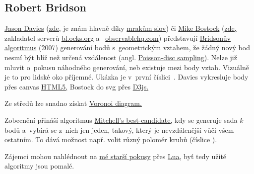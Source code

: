 \subsection{Robert Bridson}
\href{https://www.jasondavies.com/}{Jason Davies} 
(\href{https://www.jasondavies.com/poisson-disc/}{zde,} 
je znám hlavně díky 
\href{https://www.jasondavies.com/wordcloud/}{mrakům slov}) či 
\href{https://bost.ocks.org/mike/}{Mike Bostock} 
(\href{https://bl.ocks.org/mbostock/19168c663618b7f07158}{zde,} zakladatel serverů 
\href{https://bl.ocks.org/}{\url{bl.ocks.org}} a~%
\href{https://observablehq.com/}{\url{observablehq.com}}) představují 
\href{http://extremelearning.com.au/an-improved-version-of-bridsons-algorithm-n-for-poisson-disc-sampling/}{Bridsonův algoritmus} (2007)
generování bodů s~geometrickým vztahem, že žádný nový bod nesmí být blíž než určená vzdálenost (angl. 
\href{http://devmag.org.za/2009/05/03/poisson-disk-sampling/}{Poisson-disc sampling}). Nelze již mluvit o~pokusu náhodného generování, neb existuje mezi body vztah. Vizuálně je to pro lidské oko příjemné. 
Ukázka je v~první číslici~{.}
Davies vykresluje body přes canvas 
\href{https://developer.mozilla.org/en-US/docs/Web/Guide/HTML/HTML5}{HTML5,} Bostock do svg přes 
\href{https://d3js.org/}{\url{D3js}.}

\noindent
{}

Ze středů lze snadno získat 
\href{https://bl.ocks.org/mbostock/6224396}{Voronoi diagram.}

\noindent
{}


Zobecnění přináší algoritmus 
\href{https://observablehq.com/@mbostock/best-candidate-circles}{Mitchell's best-candidate,} 
kdy se generuje sada $k$ bodů a~vybírá se z~nich jen jeden, takový, který je nevzdálenější vůči všem ostatním. To dává možnost např. volit různý poloměr kruhů (číslice {}).

\noindent
{}

Zájemci mohou nahlédnout na \href{https://tex.stackexchange.com/questions/197389/how-to-fill-random-spaces-with-random-circles-in-tikz/235621#235621}{mé starší pokusy} přes 
\href{https://www.lua.org/}{Lua,} byť tedy užité algoritmy jsou pomalé.

